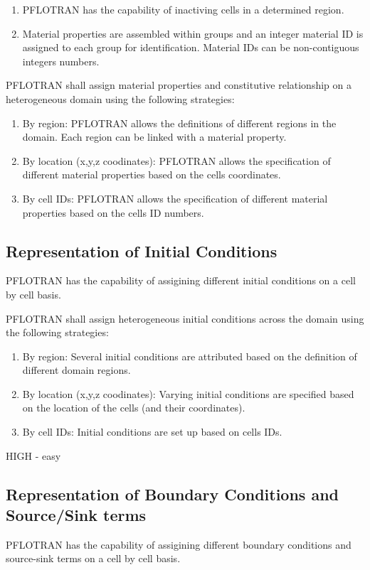 \begin{enumerate}[label=RMP \arabic*.,ref=RMP \arabic*,nosep]
	\item PFLOTRAN has the capability of inactiving cells in a determined region.
	\item Material properties are assembled within groups and an integer  material ID is assigned to each group for identification. Material IDs can be non-contiguous integers numbers.
\end{enumerate}

PFLOTRAN shall assign material properties and constitutive relationship on a heterogeneous domain using the following strategies:
\begin{enumerate}[label=RMP \arabic*.,ref=RMP \arabic*,nosep, resume]
	\item By region: \label{repMatPropRegions} PFLOTRAN allows the definitions of different regions in the domain. Each region can be linked with a material property.
	\item  By location (x,y,z coodinates): \label{repMatPropLocation} PFLOTRAN allows the specification of different material properties based on the cells coordinates.
	\item  By cell IDs: \label{repMatPropCellID} PFLOTRAN allows the specification of different material properties based on the cells ID numbers.
\end{enumerate}

\subsection{Representation of Initial Conditions}
PFLOTRAN has the capability of assigining different initial conditions on a cell by cell basis.

PFLOTRAN shall assign heterogeneous initial conditions across the domain using the following strategies:
\begin{enumerate}[label=RIC \arabic*.,ref=RIC \arabic*,nosep]
	\item By region: \label{repICRegions} Several initial conditions are attributed based on the definition of different domain regions.
	\item By location (x,y,z coodinates): \label{repICLocation} Varying initial conditions are specified based on the location of the cells (and their coordinates).
	\item By cell IDs: \label{repICCellID} Initial conditions are set up based on cells IDs.
\end{enumerate}
HIGH - easy
\subsection{Representation of Boundary Conditions and Source/Sink terms}
PFLOTRAN has the capability of assigining different boundary conditions and source-sink terms on a cell by cell basis.

